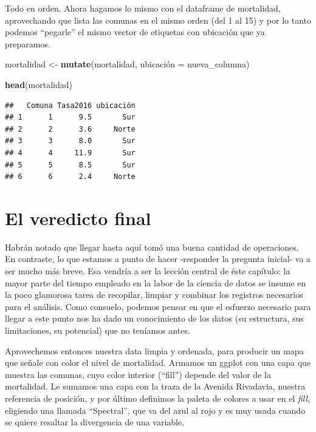 \documentclass[]{book}
\newenvironment{Shaded}{\begin{snugshade}}{\end{snugshade}}
\newcommand{\KeywordTok}[1]{\textcolor[rgb]{0.13,0.29,0.53}{\textbf{#1}}}
\newcommand{\StringTok}[1]{\textcolor[rgb]{0.31,0.60,0.02}{#1}}
\newcommand{\NormalTok}[1]{#1}
\begin{document}
Todo en orden. Ahora hagamos lo mismo con el dataframe de mortalidad,
aprovechando que lista las comunas en el mismo orden (del 1 al 15) y por
lo tanto podemos ``pegarle'' el mismo vector de etiquetas con ubicación
que ya preparamos.

\begin{Shaded}
\begin{Highlighting}[]
\NormalTok{mortalidad <-}\StringTok{ }\KeywordTok{mutate}\NormalTok{(mortalidad, ubicación =}\StringTok{ }\NormalTok{nueva_columna)}
                         
\KeywordTok{head}\NormalTok{(mortalidad)}
\end{Highlighting}
\end{Shaded}

\begin{verbatim}
##   Comuna Tasa2016 ubicación
## 1      1      9.5       Sur
## 2      2      3.6     Norte
## 3      3      8.0       Sur
## 4      4     11.9       Sur
## 5      5      8.5       Sur
## 6      6      2.4     Norte
\end{verbatim}

\section{El veredicto final}\label{el-veredicto-final}

Habrán notado que llegar hasta aquí tomó una buena cantidad de
operaciones. En contraste, lo que estamos a punto de hacer -responder la
pregunta inicial- va a ser mucho más breve. Esa vendría a ser la lección
central de éste capítulo: la mayor parte del tiempo empleado en la labor
de la ciencia de datos se insume en la poco glamorosa tarea de
recopilar, limpiar y combinar los registros necesarios para el análisis.
Como consuelo, podemos pensar en que el esfuerzo necesario para llegar a
este punto nos ha dado un conocimiento de los datos (su estructura, sus
limitaciones, su potencial) que no teníamos antes.

Aprovechemos entonces nuestra data limpia y ordenada, para producir un
mapa que señale con color el nivel de mortalidad. Armamos un ggplot con
una capa que muestra las comunas, cuyo color interior (``fill'') depende
del valor de la mortalidad. Le sumamos una capa con la traza de la
Avenida Rivadavia, nuestra referencia de posición, y por último
definimos la paleta de colores a usar en el \emph{fill}, eligiendo una
llamada ``Spectral'', que va del azul al rojo y es muy usada cuando se
quiere resaltar la divergencia de una variable.
\end{document}

